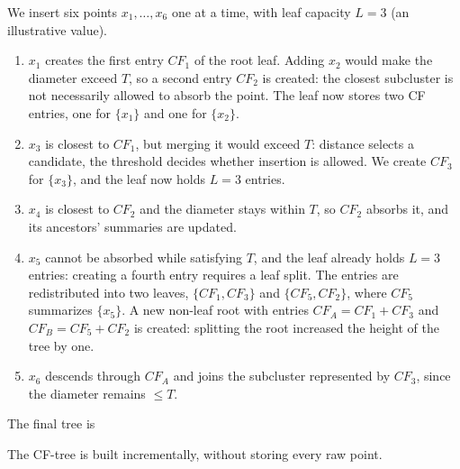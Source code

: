 \begin{example}
We insert six points $x_1, \dots, x_6$ one at a time, with leaf capacity $L = 3$ (an illustrative value).
\begin{enumerate}
  \item $x_1$ creates the first entry $CF_1$ of the root leaf. Adding $x_2$ would make the diameter exceed $T$, so a second entry $CF_2$ is created: the closest subcluster is not necessarily allowed to absorb the point. The leaf now stores two CF entries, one for $\{x_1\}$ and one for $\{x_2\}$.
  \item $x_3$ is closest to $CF_1$, but merging it would exceed $T$: distance selects a candidate, the threshold decides whether insertion is allowed. We create $CF_3$ for $\{x_3\}$, and the leaf now holds $L = 3$ entries.
  \item $x_4$ is closest to $CF_2$ and the diameter stays within $T$, so $CF_2$ absorbs it, and its ancestors' summaries are updated.
  \item $x_5$ cannot be absorbed while satisfying $T$, and the leaf already holds $L = 3$ entries: creating a fourth entry requires a leaf split. The entries are redistributed into two leaves, $\{CF_1, CF_3\}$ and $\{CF_5, CF_2\}$, where $CF_5$ summarizes $\{x_5\}$. A new non-leaf root with entries $CF_A = CF_1 + CF_3$ and $CF_B = CF_5 + CF_2$ is created: splitting the root increased the height of the tree by one.
  \item $x_6$ descends through $CF_A$ and joins the subcluster represented by $CF_3$, since the diameter remains $\le T$.
\end{enumerate}
The final tree is
\begin{center}
\end{center}
The CF-tree is built incrementally, without storing every raw point.
\end{example}

